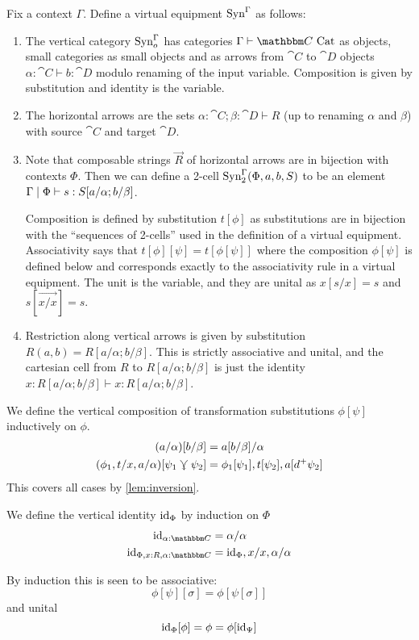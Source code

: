 \documentclass{llncs}
\begin{document}
\begin{definition}
  Fix a context $\Gamma$. Define a virtual equipment $\textrm{Syn}^\Gamma$ as
  follows:
  \begin{enumerate}
  \item The vertical category $\textrm{Syn}^\Gamma_o$ has categories $\Gamma
    \vdash \cat C \isaCat$ as objects, small categories as small
    objects and as arrows from $\cat C$ to $\cat D$ objects
    $\alpha:\cat C \vdash b : \cat D$ modulo renaming of the input
    variable. Composition is given by substitution and identity is the
    variable.
  \item The horizontal arrows are the sets $\alpha:\cat C; \beta:\cat D
    \vdash R$ (up to renaming $\alpha$ and $\beta$) with source $\cat C$
    and target $\cat D$.
  \item Note that composable strings $\vec R$ of horizontal arrows are
    in bijection with contexts $\Phi$. Then we can define a 2-cell
    $\textrm{Syn}^\Gamma_2(\Phi, a, b, S)$ to be an element
    $\Gamma\mathrel{|}\Phi\vdash s : S[a/\alpha;b/\beta]$.

    Composition is defined by substitution $t[\phi]$ as substitutions
    are in bijection with the ``sequences of 2-cells'' used in the
    definition of a virtual equipment. Associativity says that
    $t[\phi][\psi] = t[\phi[\psi]]$ where the composition $\phi[\psi]$
    is defined below and corresponds exactly to the associativity rule
    in a virtual equipment. The unit is the variable, and they are
    unital as $x[s/x] = s$ and $s[\vec {x/x}] = s$.
    
  \item Restriction along vertical arrows is given by substitution
    $R(a,b) = R[a/\alpha;b/\beta]$. This is strictly associative and
    unital, and the cartesian cell from $R$ to $R[a/\alpha;b/\beta]$
    is just the identity $x:R[a/\alpha;b/\beta] \vdash x :
    R[a/\alpha;b/\beta]$.
  \end{enumerate}
\end{definition}

\begin{definition}
  \label{lem:vertical-sq-cat}
  We define the vertical composition of transformation substitutions
  $\phi[\psi]$ inductively on $\phi$.
  \begin{align*}
    (a/\alpha)[b/\beta] &= a[b/\beta]/\alpha\\
    (\phi_1,t/x,a/\alpha)[\psi_1\curlyveedownarrow\psi_2] &= \phi_1[\psi_1], t[\psi_2],a[d^+\psi_2]
  \end{align*}
  This covers all cases by \cref{lem:inversion}.

  We define the vertical identity $\textrm{id}_\Phi$ by induction on $\Phi$
  \begin{align*}
    \id_{\alpha:\cat C} &= \alpha/\alpha\\
    \id_{\Phi,x:R,\alpha:\cat C} &= \id_{\Phi},x/x,\alpha/\alpha
  \end{align*}

  By induction this is seen to be associative:
  \[ \phi[\psi][\sigma] = \phi[\psi[\sigma]] \]
  and unital
  \[ \textrm{id}_{\Phi}[\phi] = \phi = \phi[\textrm{id}_{\Psi}] \]
\end{definition}
\fi
\end{document}
